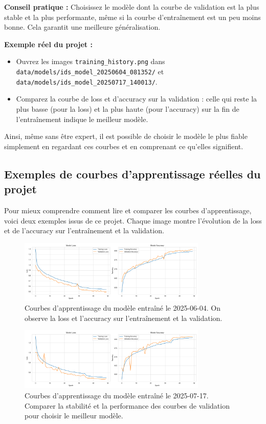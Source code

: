 \documentclass[a4paper,12pt]{article}
\begin{document}
\textbf{Conseil pratique :} Choisissez le modèle dont la courbe de validation est la plus stable et la plus performante, même si la courbe d'entraînement est un peu moins bonne. Cela garantit une meilleure généralisation.

\textbf{Exemple réel du projet :}
\begin{itemize}
  \item Ouvrez les images \texttt{training\_history.png} dans \texttt{data/models/ids\_model\_20250604\_081352/} et \texttt{data/models/ids\_model\_20250717\_140013/}.
  \item Comparez la courbe de loss et d'accuracy sur la validation : celle qui reste la plus basse (pour la loss) et la plus haute (pour l'accuracy) sur la fin de l'entraînement indique le meilleur modèle.
\end{itemize}

Ainsi, même sans être expert, il est possible de choisir le modèle le plus fiable simplement en regardant ces courbes et en comprenant ce qu'elles signifient.

\subsection{Exemples de courbes d'apprentissage réelles du projet}
Pour mieux comprendre comment lire et comparer les courbes d'apprentissage, voici deux exemples issus de ce projet. Chaque image montre l'évolution de la loss et de l'accuracy sur l'entraînement et la validation.

\begin{figure}[h!]
  \centering
  \includegraphics[width=0.8\textwidth]{data/models/ids_model_20250604_081352/training_history.png}
  \caption{Courbes d'apprentissage du modèle entraîné le 2025-06-04. On observe la loss et l'accuracy sur l'entraînement et la validation.}
\end{figure}

\begin{figure}[h!]
  \centering
  \includegraphics[width=0.8\textwidth]{data/models/ids_model_20250717_140013/training_history.png}
  \caption{Courbes d'apprentissage du modèle entraîné le 2025-07-17. Comparer la stabilité et la performance des courbes de validation pour choisir le meilleur modèle.}
\end{figure}
\end{document}
